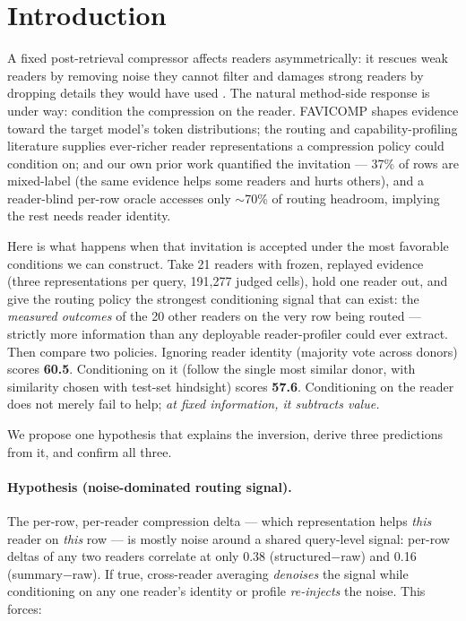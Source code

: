 \section{Introduction}
\label{sec:intro}

A fixed post-retrieval compressor affects readers asymmetrically: it rescues
weak readers by removing noise they cannot filter and damages strong readers by
dropping details they would have used \citep{panthi2026fixed, jeong2025ecorag,
xu2024recomp}. The natural method-side response is under way: condition the
compression on the reader. FAVICOMP \citep{jung2025favicomp} shapes evidence
toward the target model's token distributions; the routing and
capability-profiling literature \citep{ong2024routellm, inferencedynamics2026,
routeprofile2026} supplies ever-richer reader representations a compression
policy could condition on; and our own prior work quantified the invitation ---
37\% of rows are mixed-label (the same evidence helps some readers and hurts
others), and a reader-blind per-row oracle accesses only $\sim$70\% of routing
headroom, implying the rest needs reader identity.

Here is what happens when that invitation is accepted under the most favorable
conditions we can construct. Take 21 readers with frozen, replayed evidence
(three representations per query, 191{,}277 judged cells), hold one reader out,
and give the routing policy the strongest conditioning signal that can exist:
the \emph{measured outcomes} of the 20 other readers on the very row being
routed --- strictly more information than any deployable reader-profiler could
ever extract. Then compare two policies. Ignoring reader identity (majority
vote across donors) scores \textbf{60.5}. Conditioning on it (follow the single
most similar donor, with similarity chosen with test-set hindsight) scores
\textbf{57.6}. Conditioning on the reader does not merely fail to help; \emph{at
fixed information, it subtracts value.}

We propose one hypothesis that explains the inversion, derive three predictions
from it, and confirm all three.

\paragraph{Hypothesis (noise-dominated routing signal).} The per-row,
per-reader compression delta --- which representation helps \emph{this} reader
on \emph{this} row --- is mostly noise around a shared query-level signal:
per-row deltas of any two readers correlate at only 0.38 (structured$-$raw) and
0.16 (summary$-$raw). If true, cross-reader averaging \emph{denoises} the signal
while conditioning on any one reader's identity or profile \emph{re-injects} the
noise. This forces:

